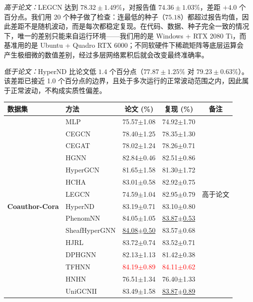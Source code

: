\documentclass[11pt,a4paper]{article}
\begin{document}
\noindent\textit{高于论文：}LEGCN 达到 $78.32\pm1.49\%$，对报告值 $74.36\pm1.03\%$，差距 $+4.0$ 个百分点。我们用 20 个种子做了检查：连最低的种子（$75.18$）都超过报告均值，因此差距不是随机波动，而是每次都稳定复现。在代码、数据、种子完全一致的情况下，唯一的差别只能来自运行环境——我们用的是 Windows + RTX 2080 Ti，而基准用的是 Ubuntu + Quadro RTX 6000；不同软硬件下稀疏矩阵等底层运算会产生极细微的数值差别，经过多层网络累积后就会改变最终准确率。

\noindent\textit{低于论文：}HyperND 比论文低 $1.4$ 个百分点（$77.87\pm1.25\%$ 对 $79.23\pm0.63\%$）。该差距已接近 1.0 个百分点的边界，且处于多次运行的正常波动范围之内，因此属于正常波动，不构成实质性偏差。
\begin{table}[H]
	\centering\small
	\begin{tabular}{llccc}
		\toprule
		数据集 & 方法 & 论文 (\%) & 复现 (\%) & 备注 \\
		\midrule
		\multirow{20}{*}{\textbf{Coauthor-Cora}} & MLP               & 75.57$\pm$1.08   & 74.92$\pm$1.70   &  \\
		 & CEGCN             & 78.40$\pm$1.25   & 78.35$\pm$1.30   &  \\
		 & CEGAT             & 78.02$\pm$1.24   & 78.26$\pm$0.71   &  \\
		 & HGNN              & 82.84$\pm$0.46   & 82.51$\pm$0.86   &  \\
		 & HyperGCN          & 81.65$\pm$1.58   & 81.30$\pm$1.72   &  \\
		 & HCHA              & 83.01$\pm$0.58   & 82.92$\pm$0.75   &  \\
		 & LEGCN             & 74.59$\pm$1.04   & 82.95$\pm$0.79   & 高于论文 \\
		 & HyperND           & 83.19$\pm$0.71   & 83.10$\pm$0.80   &  \\
		 & PhenomNN          & 84.05$\pm$1.05   & \underline{83.87$\pm$0.53}   &  \\
		 & SheafHyperGNN     & \underline{84.08$\pm$0.50}   & 83.57$\pm$0.68   &  \\
		 & HJRL              & 83.72$\pm$0.74   & 83.52$\pm$0.71   &  \\
		 & DPHGNN            & 82.13$\pm$1.13   & 81.42$\pm$0.38   &  \\
		 & TFHNN             & \textcolor{red}{84.19$\pm$0.89}   & \textcolor{red}{84.11$\pm$0.62}   &  \\
		 & HNHN              & 76.51$\pm$1.34   & 76.40$\pm$1.33   &  \\
		 & UniGCNII          & 83.49$\pm$1.58   & \underline{83.87$\pm$0.89}   &  \\

\end{tabular}
\end{table}
\end{document}

